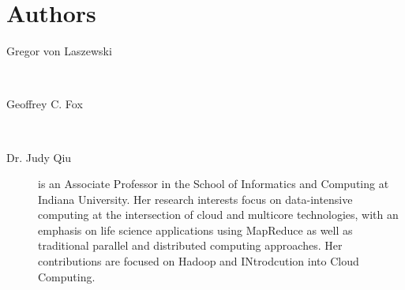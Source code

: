 \section{Authors}



\begin{description}

\item[Gregor von Laszewski] ~\\


\item[Geoffrey C. Fox] ~\\


\item [Dr. Judy Qiu] is an Associate Professor in the School of Informatics and Computing at Indiana University. Her research interests focus on data-intensive computing at the intersection of cloud and multicore technologies, with an emphasis on life science applications using MapReduce as well as traditional parallel and distributed computing approaches. Her contributions are focused on Hadoop and INtrodcution into Cloud Computing.

\end{description}
